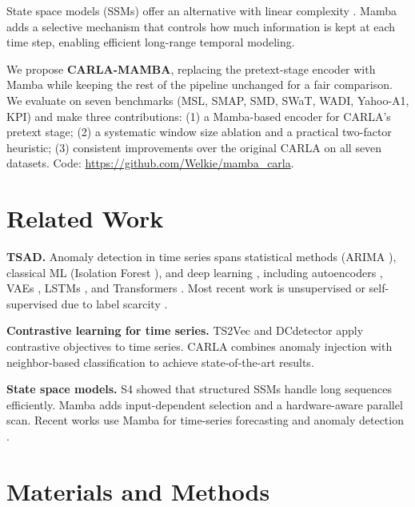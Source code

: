 \documentclass[runningheads]{llncs}
\begin{document}
State space models (SSMs) offer an alternative with linear complexity \cite{gu2022efficiently}. Mamba \cite{gu2023mamba} adds a selective mechanism that controls how much information is kept at each time step, enabling efficient long-range temporal modeling.

We propose \textbf{CARLA-MAMBA}, replacing the pretext-stage encoder with Mamba while keeping the rest of the pipeline unchanged for a fair comparison. We evaluate on seven benchmarks (MSL, SMAP, SMD, SWaT, WADI, Yahoo-A1, KPI) and make three contributions: (1) a Mamba-based encoder for CARLA's pretext stage; (2) a systematic window size ablation and a practical two-factor heuristic; (3) consistent improvements over the original CARLA on all seven datasets. Code: \url{https://github.com/Welkie/mamba_carla}.

\section{Related Work}

\textbf{TSAD.} Anomaly detection in time series spans statistical methods (ARIMA \cite{box1970distribution}), classical ML (Isolation Forest \cite{liu2008isolation}), and deep learning \cite{schmidl2022anomaly}, including autoencoders \cite{yao2023regularizing}, VAEs \cite{park2018multimodal}, LSTMs \cite{hundman2018detecting}, and Transformers \cite{tuli2022tranad,xu2021anomaly}. Most recent work is unsupervised or self-supervised due to label scarcity \cite{pang2021deep}.

\textbf{Contrastive learning for time series.} TS2Vec \cite{yue2022ts2vec} and DCdetector \cite{yang2023dcdetector} apply contrastive objectives to time series. CARLA \cite{darban2024carla} combines anomaly injection with neighbor-based classification to achieve state-of-the-art results.

\textbf{State space models.} S4 \cite{gu2022efficiently} showed that structured SSMs handle long sequences efficiently. Mamba \cite{gu2023mamba} adds input-dependent selection and a hardware-aware parallel scan. Recent works use Mamba for time-series forecasting \cite{xu2024sst} and anomaly detection \cite{chen2024joint,sellam2025maat}.

\section{Materials and Methods}
\end{document}
